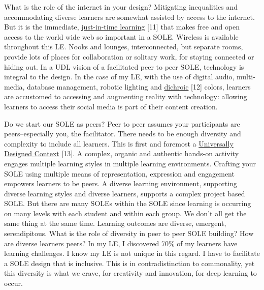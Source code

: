 What is the role of the internet in your design? Mitigating inequalities
and accommodating diverse learners are somewhat assisted by access to
the internet. But it is the immediate,
\href{http://www.wordstream.com/blog/ws/2013/10/02/just-in-time-information-hacks}{just-in-time
learning} {[}11{]} that makes free and open access to the world wide web
so important in a SOLE. Wireless is available throughout this LE. Nooks
and lounges, interconnected, but separate rooms, provide lots of places
for collaboration or solitary work, for staying connected or hiding out.
In a UDL vision of a facilitated peer to peer SOLE, technology is
integral to the design. In the case of my LE, with the use of digital
audio, multi-media, database management, robotic lighting and
\href{http://en.wikipedia.org/wiki/Dichroic\_filter}{dichroic} {[}12{]}
colors, learners are accustomed to accessing and augmenting reality with
technology: allowing learners to access their social media is part of
their content creation.

Do we start our SOLE as peers? Peer to peer assumes your participants
are peers--especially you, the facilitator. There needs to be enough
diversity and complexity to include all learners. This is first and
foremost a \href{http://www.cast.org/library/UDLguidelines/}{Universally
Designed Context} {[}13{]}. A complex, organic and authentic hands-on
activity engages multiple learning styles in multiple learning
environments. Crafting your SOLE using multiple means of representation,
expression and engagement empowers learners to be peers. A diverse
learning environment, supporting diverse learning styles and diverse
learners, supports a complex project based SOLE. But there are many
SOLEs within the SOLE since learning is occurring on many levels with
each student and within each group. We don't all get the same thing at
the same time. Learning outcomes are diverse, emergent, serendipitous.
What is the role of diversity in peer to peer SOLE building? How are
diverse learners peers? In my LE, I discovered 70\% of my learners have
learning challenges. I know my LE is not unique in this regard. I have
to facilitate a SOLE design that is inclusive. This is in
contradistinction to commonality, yet this diversity is what we crave,
for creativity and innovation, for deep learning to occur.

